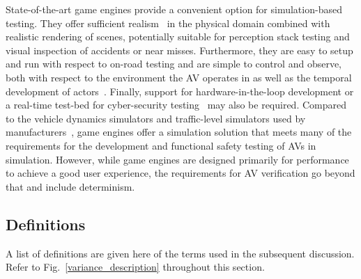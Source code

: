 \documentclass[letterpaper, 10 pt, journal, twoside]{IEEEtran}
\begin{document}
State-of-the-art game engines provide a convenient option for simulation-based testing. They offer sufficient realism~\cite{Koopman2018} in the physical domain combined with realistic rendering of scenes, potentially suitable for perception stack testing and visual inspection of accidents or near misses. 
%
Furthermore, they are easy to setup and run with respect to on-road testing and are simple to control and observe, both with respect to the environment the AV operates in as well as the temporal development of actors~\cite{Ulbrich2015}. 
%
% 
%
Finally, support for hardware-in-the-loop development or a real-time test-bed for cyber-security testing~\cite{Javaid2013} may also be required. %
%
%
Compared to the vehicle dynamics simulators and traffic-level simulators used by manufacturers~\cite{FrameworkAndChallenges}, game engines offer a simulation solution that meets many of the requirements for the development and functional safety testing of AVs in simulation. 
%
However, while game engines are designed primarily for performance to achieve a good user experience, the requirements for AV verification go beyond that and include determinism.


\subsection{Definitions}

A list of definitions are given here of the terms used in the subsequent discussion. Refer to Fig.~\ref{variance_description} throughout this section.
\end{document}
